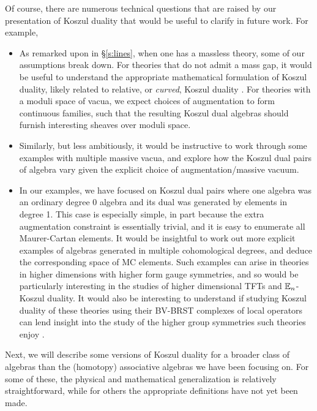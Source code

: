 \documentclass[11pt]{amsart}
\begin{document}
Of course, there are numerous technical questions that are raised by our presentation of Koszul duality that would be useful to clarify in future work. For example,
\begin{itemize}
\item As remarked upon in \S \ref{s:lines}, when one has a massless theory, some of our assumptions break down. For theories that do not admit a mass gap, it would be useful to understand the appropriate mathematical formulation of Koszul duality, likely related to relative, or \textit{curved}, Koszul duality \cite{curved}. 
For theories with a moduli space of vacua, we expect choices of augmentation to form continuous families, such that the resulting Koszul dual algebras should furnish interesting sheaves over moduli space. 

\item Similarly, but less ambitiously, it would be instructive to work through some examples with multiple massive vacua, and explore how the Koszul dual pairs of algebra vary given the explicit choice of augmentation/massive vacuum. 

\item In our examples, we have focused on Koszul dual pairs where one algebra was an ordinary degree 0 algebra and its dual was generated by elements in degree 1. 
This case is especially simple, in part because the extra augmentation constraint is essentially trivial, and it is easy to enumerate all Maurer-Cartan elements.  
It would be insightful to work out more explicit examples of algebras generated in multiple cohomological degrees, and deduce the corresponding space of MC elements. 
Such examples can arise in theories in higher dimensions with higher form gauge symmetries, and so would be particularly interesting in the studies of higher dimensional TFTs and $\mathbb E_n$-Koszul duality. 
It would also be interesting to understand if studying Koszul duality of these theories using their BV-BRST complexes of local operators can lend insight into the study of the higher group symmetries such theories enjoy \cite{2group, 2group6}.
\end{itemize}
 

Next, we will describe some versions of Koszul duality for a broader class of algebras than the (homotopy) associative algebras we have been focusing on. For some of these, the physical and mathematical generalization is relatively straightforward, while for others the appropriate definitions have not yet been made. 
\end{document}
